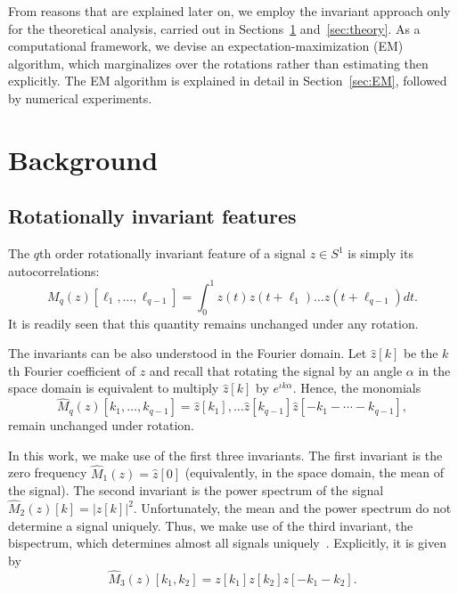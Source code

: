 \documentclass[english,12pt]{article}
\newcommand{\I}{\iota}
\numberwithin{equation}{section}
\numberwithin{thm}{section} %
\begin{document}
From reasons that are explained later on, we employ the invariant approach only for the theoretical analysis, carried out in Sections~\ref{sec:background} and~\ref{sec:theory}. As a computational framework, we devise an expectation-maximization (EM) algorithm, which marginalizes over the rotations rather than estimating then explicitly.  The EM algorithm is explained in detail in Section~\ref{sec:EM}, followed by numerical experiments.  

\section{Background} \label{sec:background}

\subsection{Rotationally invariant features} \label{sec:invariants}

The $q$th order rotationally invariant feature of a signal $z\in S^1$ is simply its autocorrelations:
\begin{equation}
M_q(z)[\ell_1,\ldots,\ell_{q-1}]=\int_{0}^1 z(t)z(t+\ell_1)\ldots z(t+\ell_{q-1})dt.
\end{equation} 
It is readily seen that this quantity remains unchanged under any rotation. 

The invariants  can be also understood in the Fourier domain.
Let ${\hat{z}[k]}$ be the $k$th Fourier coefficient of $z$ 
and recall that rotating the signal by an angle $\alpha$ in the space domain is equivalent to multiply ${\hat{z}[k]}$ by $e^{\I k\alpha}$. Hence, the monomials
\begin{equation}
\hat{M}_q(z)[k_1,\ldots,k_{q-1}]=\hat{z}[k_1],\ldots \hat{z}[k_{q-1}]{\hat{z}[-k_1-\cdots-k_{q-1}]},
\end{equation} 
remain unchanged under rotation.

In this work, we make use of the first three invariants. The first invariant is the zero frequency $\hat{M}_1(z) = \hat{z}[0]$ (equivalently, in the space domain, the mean of the signal). The second invariant is the power spectrum of the signal $\hat{M}_2(z)[k]=|z[k]|^2$. Unfortunately, the mean and the power spectrum do not determine a signal uniquely. 
Thus, we make use of the third invariant, the bispectrum, which determines almost all signals uniquely~\cite{tukey1953spectral,sadler1992shift}. Explicitly, it is given by
\begin{equation}
\hat{M}_3(z)[k_1,k_2] = z[k_1]z[k_2]z[-k_1-k_2].
\end{equation}
\end{document}
